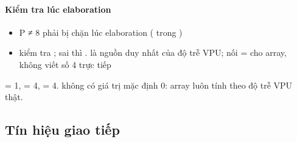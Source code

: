 \documentclass[10pt,a4paper]{article}
\begin{document}
\paragraph{Kiểm tra lúc elaboration}\label{par:2-2}
\begin{itemize}
\item P ≠ 8 phải bị chặn lúc elaboration ( trong )
\item {} kiểm tra ; sai thì .  là nguồn duy nhất của độ trễ VPU;  nối  =  cho array, không viết số 4 trực tiếp
\end{itemize}

\begin{notebox}
 = 1,  = 4,  = 4.  không có giá trị mặc định 0: array luôn tính  theo độ trễ VPU thật.
\end{notebox}

\subsection{Tín hiệu giao tiếp}\label{sec:3}
\end{document}
